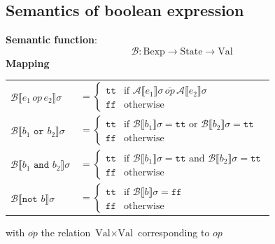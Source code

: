 \documentclass{article}
\def\li{\rightarrow}
\def\A{\mathcal{A}}
\def\B{\mathcal{B}}
\def\tt{\texttt{tt}}
\def\ff{\texttt{ff}}
\def\nott{\texttt{not }}
\def\andt{\texttt{ and }}
\def\ort{\texttt{ or }}
\def\llb{\llbracket}
\def\rrb{\rrbracket}
\begin{document}
\subsection{Semantics of boolean expression}
\textbf{Semantic function}:
$$ \B: \text{Bexp}\li \text{State} \li \text{Val}$$
\textbf{Mapping}
\begin{center}
\begin{tabular}{l l}
    $\B \llb e_1 \, op \, e_2 \rrb \sigma$ & $=
    \begin{cases}
        \tt & \text{if } \A \llb e_1\rrb \sigma \, \overline{op} \, \A \llb e_2\rrb \sigma \\
        \ff & \text{otherwise}
    \end{cases}$ \\
    $\B \llb b_1 \ort b_2 \rrb \sigma$ & $=
    \begin{cases}
        \tt & \text{if } \B \llb b_1\rrb \sigma = \tt \text{ or } \B \llb b_2\rrb \sigma  = \tt\\
        \ff & \text{otherwise}
    \end{cases}$ \\
    $\B \llb b_1 \andt b_2 \rrb \sigma$ & $=
    \begin{cases}
        \tt & \text{if } \B \llb b_1\rrb \sigma  = \tt \text{ and } \B \llb b_2\rrb \sigma  = \tt\\
        \ff & \text{otherwise}
    \end{cases}$ \\
    $\B \llb \nott b \rrb \sigma$ & $=
    \begin{cases}
        \tt & \text{if } \B \llb b\rrb \sigma = \ff \\
        \ff & \text{otherwise}
    \end{cases}$ \\
\end{tabular}
\end{center}
with $\overline{op}$ the relation $\text{Val}\times\text{Val}$ corresponding to $op$
\end{document}
